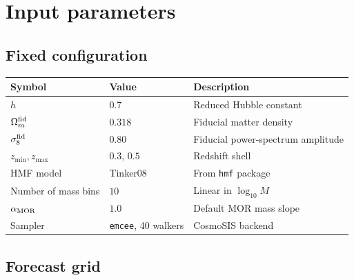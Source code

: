 \documentclass[11pt,a4paper]{article}
\begin{document}
\section{Input parameters}

\subsection{Fixed configuration}

\begin{center}
\begin{tabular}{lll}
\toprule
Symbol                     & Value                                             & Description                          \\
\midrule
$h$                        & $0.7$                                             & Reduced Hubble constant              \\
$\Omega_m^{\rm fid}$       & $0.318$                                           & Fiducial matter density              \\
$\sigma_8^{\rm fid}$       & $0.80$                                            & Fiducial power-spectrum amplitude    \\
$z_{\min}, z_{\max}$       & $0.3,\, 0.5$                                      & Redshift shell                       \\
HMF model                  & Tinker08                                          & From \texttt{hmf} package            \\
Number of mass bins        & $10$                                              & Linear in $\log_{10} M$              \\
$\alpha_{\rm MOR}$         & $1.0$                                             & Default MOR mass slope               \\
Sampler                    & \texttt{emcee}, 40 walkers                        & CosmoSIS backend                     \\
\bottomrule
\end{tabular}
\end{center}

\subsection{Forecast grid}
\end{document}
